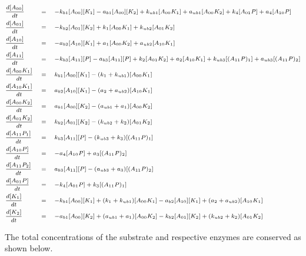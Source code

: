 \documentclass[9pt,lineno]{elife}
\begin{document}
\begin{appendixbox}
\begin{equation}
\scriptsize{    \begin{alignedat}{3}
        & \frac{d[A_{00}]}{dt} \quad &&= \quad -k_{b1}[A_{00}][K_1]-a_{b1}[A_{00}][K_2]+k_{ub1}[A_{00}K_{1}]+a_{ub1}[A_{00}K_{2}]+k_4[A_{01}P]+a_4[A_{10}P] && \\
        & \frac{d[A_{01}]}{dt} \quad &&= \quad -k_{b2}[A_{01}][K_2]+k_1[A_{00}K_{1}]+k_{ub2}[A_{01}K_{2}] && \\
        & \frac{d[A_{10}]}{dt} \quad &&= \quad -a_{b2}[A_{10}][K_1]+a_1[A_{00}K_{2}]+a_{ub2}[A_{10}K_{1}] && \\
        & \frac{d[A_{11}]}{dt} \quad &&= \quad -k_{b3}[A_{11}][P]-a_{b3}[A_{11}][P]+k_2[A_{01}K_{2}]+a_2[A_{10}K_{1}]+k_{ub3}[(A_{11}P)_1]+a_{ub3}[(A_{11}P)_2] && \\ 
        & \frac{d[A_{00}K_1]}{dt} \quad &&= \quad k_{b1}[A_{00}][K_1]-(k_1+k_{ub1})[A_{00}K_{1}] && \\
        & \frac{d[A_{10}K_1]}{dt} \quad &&= \quad a_{b2}[A_{10}][K_1]-(a_2+a_{ub2})[A_{10}K_{1}] && \\
        & \frac{d[A_{00}K_2]}{dt} \quad &&= \quad a_{b1}[A_{00}][K_2]-(a_{ub1}+a_1)[A_{00}K_{2}] && \\
        & \frac{d[A_{01}K_2]}{dt} \quad &&= \quad k_{b2}[A_{01}][K_2]-(k_{ub2}+k_2)[A_{01}K_{2}] && \\
        & \frac{d[A_{11}P_1]}{dt} \quad &&= \quad k_{b3}[A_{11}][P]-(k_{ub3}+k_3)[(A_{11}P)_1] && \\
        & \frac{d[A_{10}P]}{dt} \quad &&= \quad -a_4[A_{10}P]+a_3[(A_{11}P)_2] && \\
        & \frac{d[A_{11}P_2]}{dt} \quad &&= \quad a_{b3}[A_{11}][P]-(a_{ub3}+a_3)[(A_{11}P)_2] && \\
        & \frac{d[A_{01}P]}{dt} \quad &&= \quad -k_4[A_{01}P]+k_3[(A_{11}P)_1] && \\
        & \frac{d[K_1]}{dt} \quad &&= \quad -k_{b1}[A_{00}][K_1]+(k_1+k_{ub1})[A_{00}K_{1}]-a_{b2}[A_{10}][K_1]+(a_2+a_{ub2})[A_{10}K_{1}] && \\
        & \frac{d[K_2]}{dt} \quad &&= \quad -a_{b1}[A_{00}][K_2]+(a_{ub1}+a_1)[A_{00}K_{2}]-k_{b2}[A_{01}][K_2]+(k_{ub2}+k_2)[A_{01}K_{2}] && \\
    \end{alignedat}}
\end{equation}

The total concentrations of the substrate and respective enzymes are conserved as shown below.  


\end{appendixbox}
\end{document}
